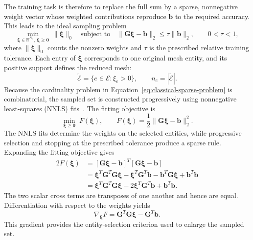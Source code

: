 \documentclass[a4paper,12pt]{article}
\newcommand{\vect}[1]{\boldsymbol{#1}}
\newcommand{\matr}[1]{\boldsymbol{#1}}
\begin{document}
The training task is therefore to replace the full sum by a sparse, nonnegative weight vector whose weighted contributions reproduce $\vect{b}$ to the required accuracy. This leads to the ideal sampling problem
\begin{equation}
 \underset{\vect{\xi}\in\mathbb R^{N_e},\ \vect{\xi}\geq\vect{0}}
            {\min}\ \|\vect{\xi}\|_0
 \quad\text{subject to}\quad
 \|\matr{G}\vect{\xi}-\vect{b}\|_2\leq\tau\|\vect{b}\|_2,
 \qquad 0<\tau<1,
 \label{eq:classical-sparse-problem}
\end{equation}
where $\|\vect{\xi}\|_0$ counts the nonzero weights and $\tau$ is the prescribed relative training tolerance. Each entry of $\vect{\xi}$ corresponds to one original mesh entity, and its positive support defines the reduced mesh:
\begin{equation}
 \widetilde{\mathcal E}=\{e\in\mathcal E:\xi_e>0\},
 \qquad n_e=|\widetilde{\mathcal E}|.
 \label{eq:classical-support}
\end{equation}
Because the cardinality problem in Equation~\eqref{eq:classical-sparse-problem} is combinatorial, the sampled set is constructed progressively using nonnegative least-squares (NNLS) fits~\cite{chapman2017accelerated}. The fitting objective is
\begin{equation}
 \underset{\vect{\xi}\geq\vect{0}}{\min}\;
 F(\vect{\xi}),\qquad
 F(\vect{\xi})=\frac12\|\matr{G}\vect{\xi}-\vect{b}\|_2^2.
 \label{eq:classical-nnls-global}
\end{equation}
The NNLS fits determine the weights on the selected entities, while progressive selection and stopping at the prescribed tolerance produce a sparse rule. Expanding the fitting objective gives
\begin{equation}
 \begin{aligned}
 2F(\vect{\xi})
 &=[\matr{G}\vect{\xi}-\vect{b}]^T
       [\matr{G}\vect{\xi}-\vect{b}]\\
 &=\vect{\xi}^T\matr{G}^T\matr{G}\vect{\xi}
   -\vect{\xi}^T\matr{G}^T\vect{b}
   -\vect{b}^T\matr{G}\vect{\xi}
   +\vect{b}^T\vect{b}\\
 &=\vect{\xi}^T\matr{G}^T\matr{G}\vect{\xi}
   -2\vect{\xi}^T\matr{G}^T\vect{b}
   +\vect{b}^T\vect{b}.
 \end{aligned}
 \label{eq:classical-quadratic-expansion}
\end{equation}
The two scalar cross terms are transposes of one another and hence are equal. Differentiation with respect to the weights yields
\begin{equation}
 \nabla_{\vect{\xi}}F
 =\matr{G}^T\matr{G}\vect{\xi}-\matr{G}^T\vect{b}.
 \label{eq:classical-fit-gradient}
\end{equation}
This gradient provides the entity-selection criterion used to enlarge the sampled set.
\end{document}
